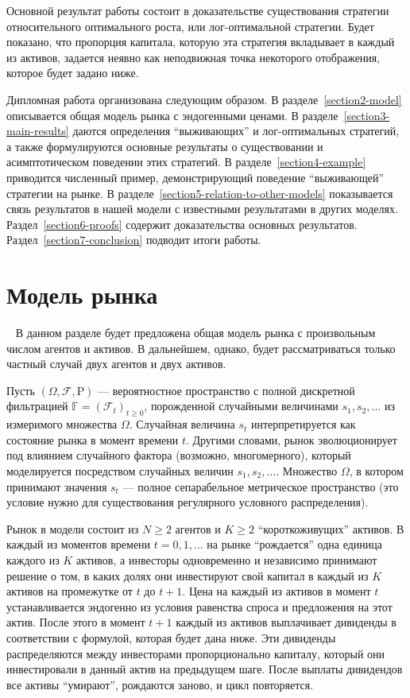 \documentclass[a4paper,12pt,russian]{article} %
\theoremstyle{definition}
\renewcommand{\P}{\mathrm{P}}
\newcommand{\F}{\mathcal{F}}
\begin{document}
Основной результат работы состоит в доказательстве существования 
стратегии относительного оптимального роста, или лог-оптимальной стратегии. 
Будет показано, что пропорция капитала, которую эта стратегия вкладывает 
в каждый из активов, задается неявно как неподвижная точка некоторого отображения, которое будет задано ниже.

Дипломная работа организована следующим образом. В разделе~\ref{section2-model} описывается общая модель рынка с эндогенными ценами. В разделе~\ref{section3-main-results} даются определения ``выживающих''  и лог-оптимальных стратегий, а также формулируются основные результаты о существовании и асимптотическом поведении этих стратегий. В разделе~\ref{section4-example} приводится численный пример, демонстрирующий поведение ``выживающей'' стратегии на рынке. В разделе~\ref{section5-relation-to-other-models} показывается связь результатов в нашей модели с известными результатами в других моделях. Раздел~\ref{section6-proofs} содержит доказательства основных результатов. Раздел~\ref{section7-conclusion} подводит итоги работы.

\section{Модель рынка}\
\label{section2-model}
В данном разделе будет предложена общая модель рынка с 
произвольным числом агентов и активов. В дальнейшем, однако, будет рассматриваться только частный случай двух агентов и двух активов.

Пусть $(\Omega,\F,\P)$ — вероятностное пространство с полной дискретной фильтрацией $\mathbb{F} = (\F_t)_{t\ge 0}$, порожденной случайными величинами $s_1, s_2, \dots$ из измеримого множества $\Omega$. Случайная величина $s_t$ интерпретируется как состояние рынка в момент времени $t$. Другими словами, рынок эволюционирует под влиянием случайного фактора (возможно, многомерного), который моделируется посредством случайных величин $s_1, s_2, \dots$. Множество $\Omega$, в котором принимают значения $s_t$ — полное сепарабельное метрическое пространство (это условие нужно для существования регулярного условного распределения).

Рынок в модели состоит из $N\ge 2$ агентов и $K\ge 2$ ``короткоживущих'' активов. В каждый из моментов времени $t=0,1,\dots$ на рынке ``рождается'' одна единица каждого из $K$ активов, а инвесторы одновременно и независимо принимают решение о том, в каких долях они инвестируют свой капитал в каждый из $K$ активов на промежутке от $t$ до $t+1$. Цена на каждый из активов в момент $t$ устанавливается эндогенно из условия равенства спроса и предложения на этот актив. После этого в момент $t+1$ каждый из активов выплачивает дивиденды в соответствии с формулой, которая будет дана ниже. Эти дивиденды распределяются между инвесторами пропорционально капиталу, который они инвестировали в данный актив на предыдущем шаге. После выплаты дивидендов все активы ``умирают'', рождаются заново, и цикл повторяется.
\end{document}
